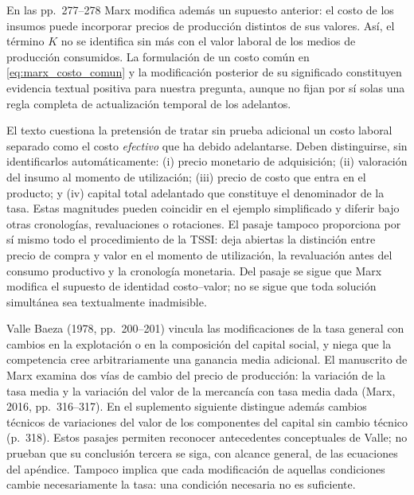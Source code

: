 \documentclass[10pt,twoside]{article}
\begin{document}
En las pp.~277--278 Marx modifica además un supuesto anterior: el costo de los insumos puede incorporar precios de producción distintos de sus valores. Así, el término $K$ no se identifica sin más con el valor laboral de los medios de producción consumidos. La formulación de un costo común en \eqref{eq:marx_costo_comun} y la modificación posterior de su significado constituyen evidencia textual positiva para nuestra pregunta, aunque no fijan por sí solas una regla completa de actualización temporal de los adelantos.

El texto cuestiona la pretensión de tratar sin prueba adicional un costo laboral separado como el costo \emph{efectivo} que ha debido adelantarse. Deben distinguirse, sin identificarlos automáticamente: (i) precio monetario de adquisición; (ii) valoración del insumo al momento de utilización; (iii) precio de costo que entra en el producto; y (iv) capital total adelantado que constituye el denominador de la tasa. Estas magnitudes pueden coincidir en el ejemplo simplificado y diferir bajo otras cronologías, revaluaciones o rotaciones. El pasaje tampoco proporciona por sí mismo todo el procedimiento de la TSSI: deja abiertas la distinción entre precio de compra y valor en el momento de utilización, la revaluación antes del consumo productivo y la cronología monetaria. Del pasaje se sigue que Marx modifica el supuesto de identidad costo--valor; no se sigue que toda solución simultánea sea textualmente inadmisible.

Valle Baeza (1978, pp.~200--201) vincula las modificaciones de la tasa general con cambios en la explotación o en la composición del capital social, y niega que la competencia cree arbitrariamente una ganancia media adicional. El manuscrito de Marx examina dos vías de cambio del precio de producción: la variación de la tasa media y la variación del valor de la mercancía con tasa media dada (Marx, 2016, pp.~316--317). En el suplemento siguiente distingue además cambios técnicos de variaciones del valor de los componentes del capital sin cambio técnico (p.~318). Estos pasajes permiten reconocer antecedentes conceptuales de Valle; no prueban que su conclusión tercera se siga, con alcance general, de las ecuaciones del apéndice. Tampoco implica que cada modificación de aquellas condiciones cambie necesariamente la tasa: una condición necesaria no es suficiente.
\end{document}
